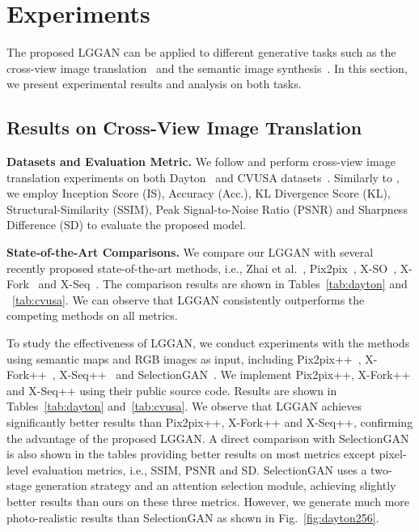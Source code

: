 \documentclass[10pt,twocolumn,letterpaper]{article}
\begin{document}
 \section{Experiments}
\label{sec:experiments}
The proposed LGGAN can be applied to different generative tasks such as the cross-view image translation~\cite{tang2019multi} and the semantic image synthesis~\cite{park2019semantic}. In this section, we present experimental results and analysis on both tasks.

\subsection{Results on Cross-View Image Translation}

\noindent \textbf{Datasets and Evaluation Metric.}
We follow \cite{tang2019multi} and perform cross-view image translation experiments on both Dayton~\cite{vo2016localizing} and CVUSA datasets~\cite{workman2015wide}.
Similarly to \cite{regmi2018cross,tang2019multi}, we employ Inception Score (IS), Accuracy (Acc.), KL Divergence Score (KL), Structural-Similarity (SSIM), Peak Signal-to-Noise Ratio (PSNR) and Sharpness Difference (SD) to evaluate the proposed model.

\noindent\textbf{State-of-the-Art Comparisons.}
We compare our LGGAN with several recently proposed state-of-the-art methods, i.e., 
Zhai et al.~\cite{zhai2017predicting},
Pix2pix~\cite{isola2017image}, X-SO~\cite{regmi2019cross}, X-Fork~\cite{regmi2018cross} and X-Seq~\cite{regmi2018cross}.
The comparison results are shown in Tables~\ref{tab:dayton} and ~\ref{tab:cvusa}.
We can observe that LGGAN consistently outperforms the competing methods on all metrics. 

To study the effectiveness of LGGAN, we conduct experiments with the methods using semantic maps and RGB images as input, including Pix2pix++~\cite{isola2017image}, X-Fork++~\cite{regmi2018cross}, X-Seq++~\cite{regmi2018cross} and SelectionGAN~\cite{tang2019multi}.
We implement Pix2pix++, X-Fork++ and X-Seq++ using their public source code.
Results are shown in Tables~\ref{tab:dayton} and~\ref{tab:cvusa}. 
We observe that LGGAN achieves significantly better results than Pix2pix++, X-Fork++ and X-Seq++, confirming the advantage of the proposed LGGAN.
A direct comparison with SelectionGAN is also shown in the tables providing better results on most metrics except pixel-level evaluation metrics, i.e., SSIM, PSNR and SD. 
SelectionGAN uses a two-stage generation strategy and an attention selection module, achieving slightly better results than ours on these three metrics.
However, we generate much more photo-realistic results than SelectionGAN as shown in Fig.~\ref{fig:dayton256}.
\end{document}
